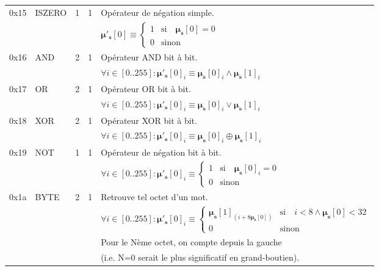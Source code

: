 \documentclass[9pt,oneside]{amsart}
\begin{document}
\begin{tabular*}{\columnwidth}[h]{rlrrl}
\midrule
0x15 & {\small ISZERO} & 1 & 1 & Opérateur de négation simple. \\
&&&& $\boldsymbol{\mu}'_\mathbf{s}[0] \equiv \begin{cases} 1 & \text{si} \quad \boldsymbol{\mu}_\mathbf{s}[0] = 0 \\ 0 & \text{sinon} \end{cases}$ \\
\midrule
0x16 & {\small AND} & 2 & 1 & Opérateur AND bit à bit. \\
&&&& $\forall i \in [0..255]: \boldsymbol{\mu}'_\mathbf{s}[0]_i \equiv \boldsymbol{\mu}_\mathbf{s}[0]_i \wedge \boldsymbol{\mu}_\mathbf{s}[1]_i$ \\
\midrule
0x17 & {\small OR} & 2 & 1 & Opérateur OR bit à bit. \\
&&&& $\forall i \in [0..255]: \boldsymbol{\mu}'_\mathbf{s}[0]_i \equiv \boldsymbol{\mu}_\mathbf{s}[0]_i \vee \boldsymbol{\mu}_\mathbf{s}[1]_i$ \\
\midrule
0x18 & {\small XOR} & 2 & 1 & Opérateur XOR bit à bit. \\
&&&& $\forall i \in [0..255]: \boldsymbol{\mu}'_\mathbf{s}[0]_i \equiv \boldsymbol{\mu}_\mathbf{s}[0]_i \oplus \boldsymbol{\mu}_\mathbf{s}[1]_i$ \\
\midrule
0x19 & {\small NOT} & 1 & 1 & Opérateur de négation bit à bit. \\
&&&& $\forall i \in [0..255]: \boldsymbol{\mu}'_\mathbf{s}[0]_i \equiv \begin{cases} 1 & \text{si} \quad \boldsymbol{\mu}_\mathbf{s}[0]_i = 0 \\ 0 & \text{sinon} \end{cases}$ \\
\midrule
0x1a & {\small BYTE} & 2 & 1 & Retrouve tel octet d'un mot. \\
&&&& $\forall i \in [0..255]: \boldsymbol{\mu}'_\mathbf{s}[0]_i \equiv \begin{cases} \boldsymbol{\mu}_\mathbf{s}[1]_{(i + 8\boldsymbol{\mu}_\mathbf{s}[0])} & \text{si} \quad i < 8 \wedge \boldsymbol{\mu}_\mathbf{s}[0] < 32 \\ 0 & \text{sinon} \end{cases} $\\
&&&& Pour le Nème octet, on compte depuis la gauche \\
&&&& (i.e. N=0 serait le plus significatif en grand-boutien). \\
\bottomrule
\end{tabular*}
\end{document}
